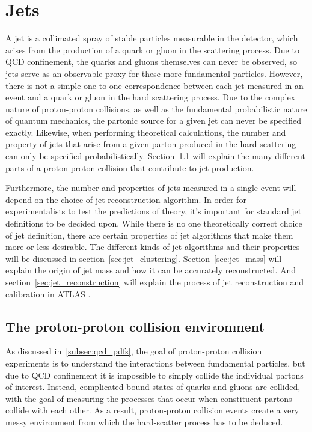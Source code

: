 \chapter{Jets} \label{ch:jets}

A jet is a collimated spray of stable particles measurable in the detector,
which arises from the production of a quark or gluon in the scattering process.
Due to QCD confinement, the quarks and gluons themselves can never be observed,
so jets serve as an observable proxy for these more fundamental particles.
However, there is not a simple one-to-one correspondence between each jet measured in an event and a quark or gluon in the hard scattering process.
Due to the complex nature of proton-proton collisions, as well as the fundamental probabilistic nature of quantum mechanics, the partonic source for a given jet can never be specified exactly.
Likewise, when performing theoretical calculations, the number and property of jets that arise from a given parton produced in the hard scattering can only be specified probabilistically.
Section~\ref{sec:jet_collisions} will explain the many different parts of a proton-proton collision that contribute to jet production.

Furthermore, the number and properties of jets measured in a single event will depend on the choice of jet reconstruction algorithm.
In order for experimentalists to test the predictions of theory, it's important for standard jet definitions to be decided upon.
While there is no one theoretically correct choice of jet definition, there are certain properties of jet algorithms that make them more or less desirable.
The different kinds of jet algorithms and their properties will be discussed in section~\ref{sec:jet_clustering}.
Section~\ref{sec:jet_mass} will explain the origin of jet mass and how it can be accurately reconstructed.
And section~\ref{sec:jet_reconstruction} will explain the process of jet reconstruction and calibration in ATLAS .

\section{The proton-proton collision environment}\label{sec:jet_collisions}

As discussed in~\ref{subsec:qcd_pdfs}, the goal of proton-proton collision experiments is to understand the interactions
between fundamental particles, but due to QCD confinement it is impossible to simply collide the individual partons of interest.
Instead, complicated bound states of quarks and gluons are collided,
with the goal of measuring the processes that occur when constituent partons collide with each other.
As a result, proton-proton collision events create a very messy environment from which the hard-scatter process
has to be deduced.

